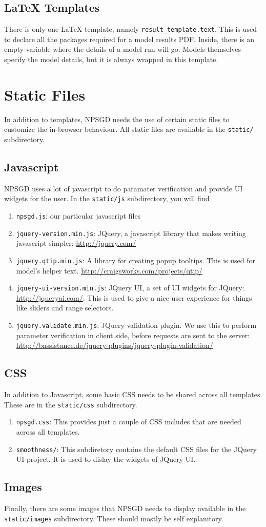 \documentclass{article}
\newcommand{\mpath}[1]{\texttt{#1}}
\begin{document}
\subsection{LaTeX Templates}
There is only one LaTeX template, namely \mpath{result\_template.text}. This is
used to declare all the packages required for a model results PDF. Inside, there
is an empty variable where the details of a model run will go. Models themselves
specify the model details, but it is always wrapped in this template.

\section{Static Files}
In addition to templates, NPSGD needs the use of certain static files to
customize the in-browser behaviour. All static files are available in the
\mpath{static/} subdirectory.

\subsection{Javascript}
NPSGD uses a lot of javascript to do paramater verification and provide UI
widgets for the user. In the \mpath{static/js} subdirectory, you will find
\begin{enumerate}
    \item \texttt{npsgd.js}: our particular javascript files
    \item \texttt{jquery-version.min.js}: JQuery, a javascript library that
    makes writing javascript simpler: \url{http://jquery.com/}
    \item \texttt{jquery.qtip.min.js}: A library for creating popup tooltips.
    This is used for model's helper text.
    \url{http://craigsworks.com/projects/qtip/}
    \item \texttt{jquery-ui-version.min.js}: JQuery UI, a set of UI widgets for
    JQuery: \url{http://jqueryui.com/}. This is used to give a nice user
    experience for things like sliders and range selectors.
    \item \texttt{jquery.validate.min.js}: JQuery validation plugin. We use this
    to perform parameter verification in client side, before requests are sent
    to the server:
    \url{http://bassistance.de/jquery-plugins/jquery-plugin-validation/}
\end{enumerate}

\subsection{CSS}
In addition to Javascript, some basic CSS needs to be shared across all
templates. These are in the \mpath{static/css} subdirectory.
\begin{enumerate}
    \item \texttt{npsgd.css}: This provides just a couple of CSS includes that
    are needed across all templates.
    \item \texttt{smoothness/}: This subdiretory contains the default CSS files
    for the JQuery UI project. It is used to dislay the widgets of JQuery UI.
\end{enumerate}

\subsection{Images}
Finally, there are some images that NPSGD needs to display available in the
\mpath{static/images} subdirectory. These should mostly be self explanitory. 
\end{document}
